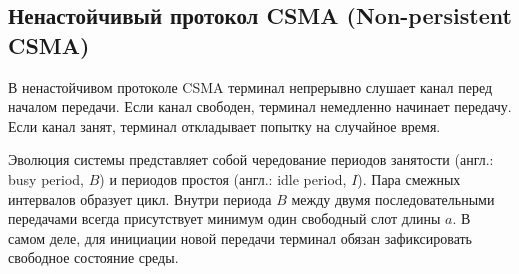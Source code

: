 \subsection{Ненастойчивый протокол CSMA (Non-persistent CSMA)}

В ненастойчивом протоколе CSMA терминал непрерывно слушает канал перед началом передачи. Если канал свободен, терминал немедленно начинает передачу. Если канал занят, терминал откладывает попытку на случайное время. 

Эволюция системы представляет собой чередование периодов занятости (англ.: busy period, $B$) и периодов простоя (англ.: idle period, $I$). Пара смежных интервалов образует цикл. Внутри периода $B$ между двумя последовательными передачами всегда присутствует минимум один свободный слот длины $a$. В самом деле, для инициации новой передачи терминал обязан зафиксировать свободное состояние среды.

